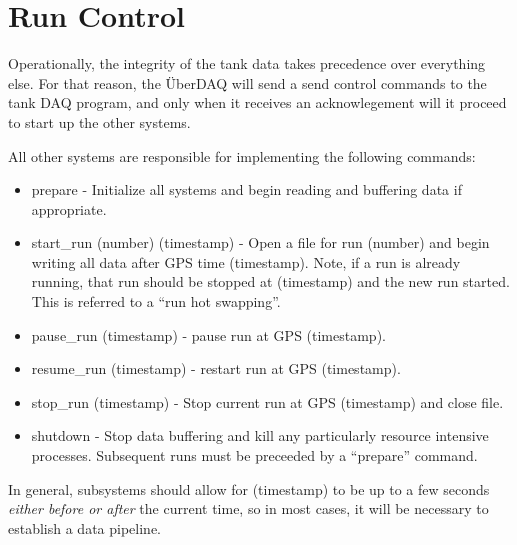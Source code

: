 \section{Run Control}

Operationally, the integrity of the tank data takes 
precedence over everything else.  For that reason, the \"UberDAQ
will send a send control commands to the tank DAQ program, and
only when it receives an acknowlegement will it proceed to start
up the other systems.

All other systems are responsible for implementing the following
commands:

\begin{itemize} 
\item prepare - Initialize all systems and begin reading and buffering data
if appropriate.
\item start_run (number) (timestamp) - Open a file for run (number) and
begin writing all data after GPS time (timestamp).  Note, if a run is
already running, that run should be stopped at (timestamp) and the new
run started.  This is referred to a ``run hot swapping''.
\item pause_run (timestamp) - pause  run at GPS (timestamp).
\item resume_run (timestamp) - restart run at GPS (timestamp).
\item stop_run (timestamp) - Stop current run at GPS (timestamp) and close
file.
\item shutdown - Stop data buffering and kill any particularly
resource intensive processes.  Subsequent runs must be preceeded
by a ``prepare'' command.
\end{itemize}

In general, subsystems should allow for (timestamp) to be 
up to a few seconds {\em either before or after} the current time,
so in most cases, it will be necessary to establish a data pipeline.







